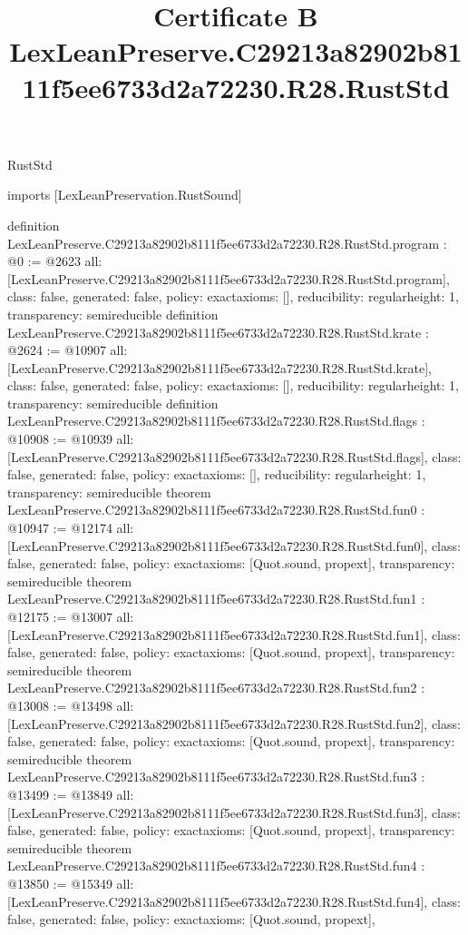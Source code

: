 \begin{lexlean}{RustStd}
\title{Certificate B LexLeanPreserve.C29213a82902b8111f5ee6733d2a72230.R28.RustStd}
\begin{coremodule}
imports [LexLeanPreservation.RustSound]

definition LexLeanPreserve.C29213a82902b8111f5ee6733d2a72230.R28.RustStd.program : @0 := @2623 {
  all: [LexLeanPreserve.C29213a82902b8111f5ee6733d2a72230.R28.RustStd.program],
  class: false,
  generated: false,
  policy: exact{axioms: []},
  reducibility: regular{height: 1},
  transparency: semireducible
}
definition LexLeanPreserve.C29213a82902b8111f5ee6733d2a72230.R28.RustStd.krate : @2624 := @10907 {
  all: [LexLeanPreserve.C29213a82902b8111f5ee6733d2a72230.R28.RustStd.krate],
  class: false,
  generated: false,
  policy: exact{axioms: []},
  reducibility: regular{height: 1},
  transparency: semireducible
}
definition LexLeanPreserve.C29213a82902b8111f5ee6733d2a72230.R28.RustStd.flags : @10908 := @10939 {
  all: [LexLeanPreserve.C29213a82902b8111f5ee6733d2a72230.R28.RustStd.flags],
  class: false,
  generated: false,
  policy: exact{axioms: []},
  reducibility: regular{height: 1},
  transparency: semireducible
}
theorem LexLeanPreserve.C29213a82902b8111f5ee6733d2a72230.R28.RustStd.fun0 : @10947 := @12174 {
  all: [LexLeanPreserve.C29213a82902b8111f5ee6733d2a72230.R28.RustStd.fun0],
  class: false,
  generated: false,
  policy: exact{axioms: [Quot.sound, propext]},
  transparency: semireducible
}
theorem LexLeanPreserve.C29213a82902b8111f5ee6733d2a72230.R28.RustStd.fun1 : @12175 := @13007 {
  all: [LexLeanPreserve.C29213a82902b8111f5ee6733d2a72230.R28.RustStd.fun1],
  class: false,
  generated: false,
  policy: exact{axioms: [Quot.sound, propext]},
  transparency: semireducible
}
theorem LexLeanPreserve.C29213a82902b8111f5ee6733d2a72230.R28.RustStd.fun2 : @13008 := @13498 {
  all: [LexLeanPreserve.C29213a82902b8111f5ee6733d2a72230.R28.RustStd.fun2],
  class: false,
  generated: false,
  policy: exact{axioms: [Quot.sound, propext]},
  transparency: semireducible
}
theorem LexLeanPreserve.C29213a82902b8111f5ee6733d2a72230.R28.RustStd.fun3 : @13499 := @13849 {
  all: [LexLeanPreserve.C29213a82902b8111f5ee6733d2a72230.R28.RustStd.fun3],
  class: false,
  generated: false,
  policy: exact{axioms: [Quot.sound, propext]},
  transparency: semireducible
}
theorem LexLeanPreserve.C29213a82902b8111f5ee6733d2a72230.R28.RustStd.fun4 : @13850 := @15349 {
  all: [LexLeanPreserve.C29213a82902b8111f5ee6733d2a72230.R28.RustStd.fun4],
  class: false,
  generated: false,
  policy: exact{axioms: [Quot.sound, propext]},
}
\end{coremodule}
\end{lexlean}
